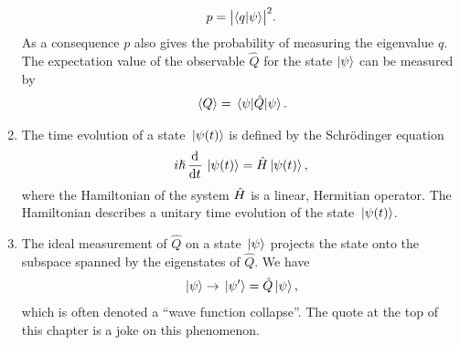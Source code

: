 \begin{enumerate}
\begin{align}
                    p = \abs{\braket{q}{\psi}}^2.
                \end{align}
                As a consequence $p$ also gives the probability of measuring the
                eigenvalue $q$.
                The expectation value of the observable $\hat{Q}$ for the state
                $\ket{\psi}$ can be measured by
                \begin{align}
                    \expval*{Q} = \expval*{\hat{Q}}{\psi}.
                \end{align}
            \item The time evolution of a state $\ket*{\psi(t)}$ is defined by
                the Schrödinger equation
                \begin{align}
                    i\hslash \dod[]{}{t}\ket*{\psi(t)} = \hamil\ket*{\psi(t)},
                \end{align}
                where the Hamiltonian of the system $\hat{H}$ is a linear,
                Hermitian operator.
                The Hamiltonian describes a unitary time evolution of the state
                $\ket*{\psi(t)}$.
            \item The ideal measurement of $\hat{Q}$ on a state $\ket*{\psi}$
                projects the state onto the subspace spanned by the eigenstates
                of $\hat{Q}$.
                We have
                \begin{align}
                    \ket*{\psi}
                    \to
                    \ket*{\psi'}
                    =
                    \hat{Q}\ket*{\psi},
                \end{align}
                which is often denoted a ``wave function collapse''.
                The quote at the top of this chapter is a joke on this
                phenomenon.
        \end{enumerate}

